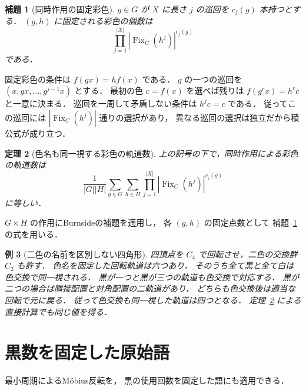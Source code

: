 \documentclass[a5paper,10pt,onecolumn]{jsarticle}
\makeatletter
\theoremstyle{mathnotetheorem}
\newtheorem{theorem}{定理}[section]
\newtheorem{lemma}[theorem]{補題}
\newtheorem{example}[theorem]{例}
\renewcommand{\proofname}{証明}
\renewenvironment{proof}[1][\proofname]{%
  \par\pushQED{\qed}\normalfont\topsep4\p@\@plus2\p@\relax
  \trivlist\item[\hskip\labelsep\bfseries #1]\ignorespaces
}{\popQED\endtrivlist\@endpefalse}
\makeatother
\begin{document}
\begin{lemma}[同時作用の固定彩色]\label{lem:doubleactionfix}
$g\in G$ が $X$ に長さ $j$ の巡回を $c_j(g)$ 本持つとする．
$(g,h)$ に固定される彩色の個数は
\begin{equation}\label{eq:doubleactionfix}
 \prod_{j=1}^{|X|}
 |\operatorname{Fix}_C(h^j)|^{c_j(g)}
\end{equation}
である．
\end{lemma}
\begin{proof}
固定彩色の条件は
$f(gx)=h f(x)$ である．
$g$ の一つの巡回を $(x,gx,\ldots,g^{j-1}x)$ とする．
最初の色 $c=f(x)$ を選べば残りは
$f(g^rx)=h^rc$ と一意に決まる．
巡回を一周して矛盾しない条件は $h^jc=c$ である．
従ってこの巡回には
$|\operatorname{Fix}_C(h^j)|$ 通りの選択があり，
異なる巡回の選択は独立だから積公式が成り立つ．
\end{proof}

\begin{theorem}[色名も同一視する彩色の軌道数]\label{thm:doubleaction}
上の記号の下で，同時作用による彩色の軌道数は
\[
 \frac1{|G||H|}\sum_{g\in G}\sum_{h\in H}
 \prod_{j=1}^{|X|}|\operatorname{Fix}_C(h^j)|^{c_j(g)}
\]
に等しい．
\end{theorem}
\begin{proof}
$G\times H$ の作用にBurnsideの補題を適用し，
各 $(g,h)$ の固定点数として
補題~\ref{lem:doubleactionfix} の式を用いる．
\end{proof}

\begin{example}[二色の名前を区別しない四角形]
四頂点を $C_4$ で回転させ，二色の交換群 $C_2$ も許す．
色名を固定した回転軌道は六つあり，
そのうち全て黒と全て白は色交換で同一視される．
黒が一つと黒が三つの軌道も色交換で対応する．
黒が二つの場合は隣接配置と対角配置の二軌道があり，
どちらも色交換後は適当な回転で元に戻る．
従って色交換も同一視した軌道は四つとなる．
定理~\ref{thm:doubleaction} による直接計算でも同じ値を得る．
\end{example}

\section{黒数を固定した原始語}
最小周期によるM\"obius反転を，
黒の使用回数を固定した語にも適用できる．
\end{document}
